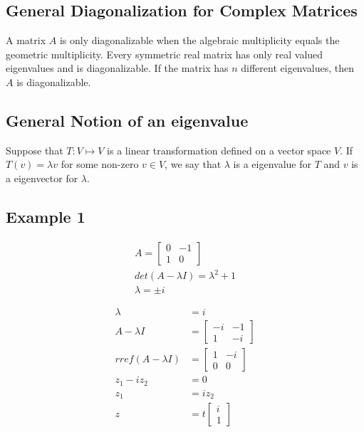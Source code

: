 \documentclass{article}
\theoremstyle{mytheoremstyle}
\theoremstyle{mytheoremstyle}
\theoremstyle{myproblemstyle}
\begin{document}
    \subsection*{General Diagonalization for Complex Matrices}
    A matrix $A$ is only diagonalizable when the algebraic multiplicity equals
    the geometric multiplicity. Every symmetric real matrix has only real valued
    eigenvalues and is diagonalizable. If the matrix has $n$ different
    eigenvalues, then $A$ is diagonalizable.

    \subsection*{General Notion of an eigenvalue}
    Suppose that $T: V \mapsto V$ is a linear transformation defined on a vector
    space $V$. If $T(v)=\lambda v$ for some non-zero $v\in V$, we say that
    $\lambda$ is a eigenvalue for $T$ and $v$ is a eigenvector for $\lambda$.

    \subsection*{Example 1}
    \begin{align*}
        A = \begin{bmatrix}
            0 & -1 \\
            1 & 0
        \end{bmatrix} \\
        det(A-\lambda I) = \lambda^2 + 1 \\
        \lambda = \pm i
    \end{align*}

    \begin{align*}
        \lambda &= i \\
        A-\lambda I &= \begin{bmatrix}
            -i & -1 \\
            1 & -i
        \end{bmatrix} \\
        rref(A-\lambda I) &= \begin{bmatrix}
            1 & -i \\
            0 & 0
        \end{bmatrix} \\
        z_1 - iz_2 &= 0 \\
        z_1 &= iz_2 \\
        z &= t \begin{bmatrix}
            i \\ 1
        \end{bmatrix}
    \end{align*}
\end{document}
